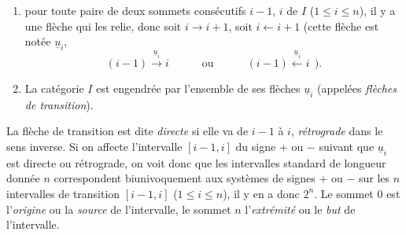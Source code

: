 \begin{enumerate}
\item[a)] pour toute paire de deux sommets consécutifs $i-1$, $i$ de $I$ ($1\leq i\leq n$), il y a une flèche qui les relie, donc soit $i\longrightarrow i+1$, soit $i\longleftarrow i+1$ (cette flèche est notée $\underline{u}_i$,
\[
(i-1)\xrightarrow{\underline{u}_i}i\qquad\quad\text{ou}\qquad\quad(i-1)\xleftarrow{\underline{u}_i}i\ \ ).
\]
\item[b)] La catégorie $I$ est engendrée par l'ensemble de ses flèches $\underline{u}_i$ (appelées \textit{flèches de transition}).
\end{enumerate}

La flèche de transition est dite \textit{directe} si elle va de $i-1$ à $i$, \textit{rétrograde} dans le sens inverse. Si on affecte l'intervalle $[i-1,i]$ du signe $+$ ou $-$ suivant que $\underline{u}_i$ est directe ou rétrograde, on voit donc que les
intervalles standard de longueur donnée $n$ correspondent biunivoquement aux systèmes de signes $+$ ou $-$ sur les $n$ intervalles de transition $[i-1,i]$ ($1\leq i\leq n$), il y en a donc $2^n$. Le sommet $0$ est l'\textit{origine} ou la \textit{source} de l'intervalle, le sommet $n$ l'\textit{extrémité} ou le \textit{but} de l'intervalle.

